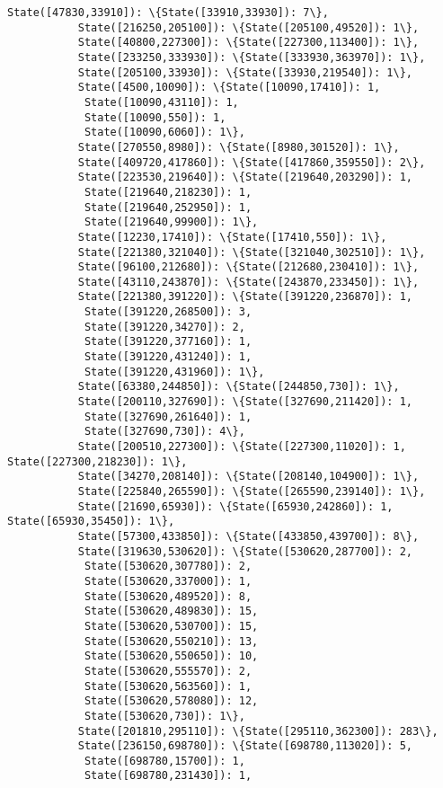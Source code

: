 \documentclass[11pt]{article}
\begin{document}
\begin{Verbatim}[commandchars=\\\{\}]
           State([47830,33910]): \{State([33910,33930]): 7\},
           State([216250,205100]): \{State([205100,49520]): 1\},
           State([40800,227300]): \{State([227300,113400]): 1\},
           State([233250,333930]): \{State([333930,363970]): 1\},
           State([205100,33930]): \{State([33930,219540]): 1\},
           State([4500,10090]): \{State([10090,17410]): 1,
            State([10090,43110]): 1,
            State([10090,550]): 1,
            State([10090,6060]): 1\},
           State([270550,8980]): \{State([8980,301520]): 1\},
           State([409720,417860]): \{State([417860,359550]): 2\},
           State([223530,219640]): \{State([219640,203290]): 1,
            State([219640,218230]): 1,
            State([219640,252950]): 1,
            State([219640,99900]): 1\},
           State([12230,17410]): \{State([17410,550]): 1\},
           State([221380,321040]): \{State([321040,302510]): 1\},
           State([96100,212680]): \{State([212680,230410]): 1\},
           State([43110,243870]): \{State([243870,233450]): 1\},
           State([221380,391220]): \{State([391220,236870]): 1,
            State([391220,268500]): 3,
            State([391220,34270]): 2,
            State([391220,377160]): 1,
            State([391220,431240]): 1,
            State([391220,431960]): 1\},
           State([63380,244850]): \{State([244850,730]): 1\},
           State([200110,327690]): \{State([327690,211420]): 1,
            State([327690,261640]): 1,
            State([327690,730]): 4\},
           State([200510,227300]): \{State([227300,11020]): 1, State([227300,218230]): 1\},
           State([34270,208140]): \{State([208140,104900]): 1\},
           State([225840,265590]): \{State([265590,239140]): 1\},
           State([21690,65930]): \{State([65930,242860]): 1, State([65930,35450]): 1\},
           State([57300,433850]): \{State([433850,439700]): 8\},
           State([319630,530620]): \{State([530620,287700]): 2,
            State([530620,307780]): 2,
            State([530620,337000]): 1,
            State([530620,489520]): 8,
            State([530620,489830]): 15,
            State([530620,530700]): 15,
            State([530620,550210]): 13,
            State([530620,550650]): 10,
            State([530620,555570]): 2,
            State([530620,563560]): 1,
            State([530620,578080]): 12,
            State([530620,730]): 1\},
           State([201810,295110]): \{State([295110,362300]): 283\},
           State([236150,698780]): \{State([698780,113020]): 5,
            State([698780,15700]): 1,
            State([698780,231430]): 1,

\end{Verbatim}
\end{document}
